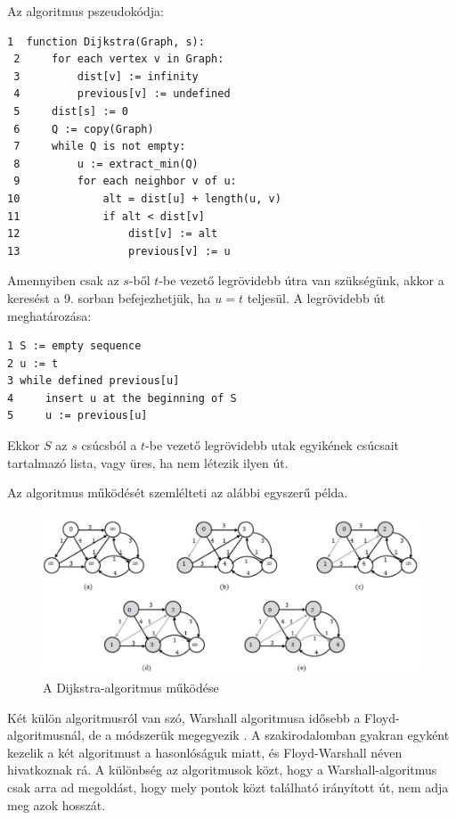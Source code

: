 Az algoritmus pszeudokódja:

\begin{verbatim}
1  function Dijkstra(Graph, s):
 2     for each vertex v in Graph:     
 3         dist[v] := infinity         
 4         previous[v] := undefined
 5     dist[s] := 0                    
 6     Q := copy(Graph)                
 7     while Q is not empty:
 8         u := extract_min(Q)        
 9         for each neighbor v of u:
10             alt = dist[u] + length(u, v)
11             if alt < dist[v]       
12                 dist[v] := alt      
13                 previous[v] := u
\end{verbatim}

Amennyiben csak az $s$-ből $t$-be vezető legrövidebb útra van szükségünk, akkor a keresést a 9. sorban befejezhetjük, ha $u = t$ teljesül. A legrövidebb út meghatározása:

\begin{verbatim}
1 S := empty sequence
2 u := t
3 while defined previous[u]
4     insert u at the beginning of S
5     u := previous[u]
\end{verbatim}

Ekkor $S$ az $s$ csúcsból a $t$-be vezető legrövidebb utak egyikének csúcsait tartalmazó lista, vagy üres, ha nem létezik ilyen út.

Az algoritmus működését szemlélteti az alábbi egyszerű példa.

\begin{figure}[htb]
\centering
\includegraphics[scale=0.5]{kepek/dijkstra.jpg}
\caption{A Dijkstra-algoritmus működése}
\label{fig:dijkstra}
\end{figure}


Két külön algoritmusról van szó, Warshall algoritmusa idősebb a Floyd-algoritmusnál, de a módszerük megegyezik \cite{floyd-warshall}. A szakirodalomban gyakran egyként kezelik a két algoritmust a hasonlóságuk miatt, és Floyd-Warshall néven hivatkoznak rá.
A különbség az algoritmusok közt, hogy a Warshall-algoritmus csak arra ad megoldást, hogy mely pontok közt található irányított út, nem adja meg azok hosszát.

